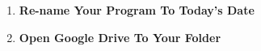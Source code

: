 \documentclass{article}
\begin{document}
\begin{enumerate}
\item {\large \textbf{Re-name Your Program To Today's Date}}


\newpage

\item {\large \textbf{Open Google Drive To Your Folder}}


\end{enumerate}
\end{document}
